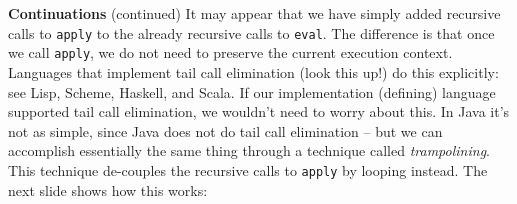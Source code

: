 \begin{minipage}[t]{\sw}
\slidenumber
\LARGE
{\bf Continuations} (continued)\exx
It may appear that we have simply added recursive calls to \verb'apply'
to the already recursive calls to \verb'eval'.
The difference is that once we call \verb'apply',
we do not need to preserve the current execution context.
Languages that implement tail call elimination (look this up!)
do this explicitly: see Lisp, Scheme, Haskell, and Scala.\exx
If our implementation (defining) language supported tail call elimination,
we wouldn't need to worry about this.
In Java it's not as simple,
since Java does not do tail call elimination --
but we can accomplish essentially the same thing
through a technique called {\em trampolining}.
This technique de-couples the recursive calls to \verb'apply'
by looping instead.  The next slide shows how this works:
\end{minipage}
